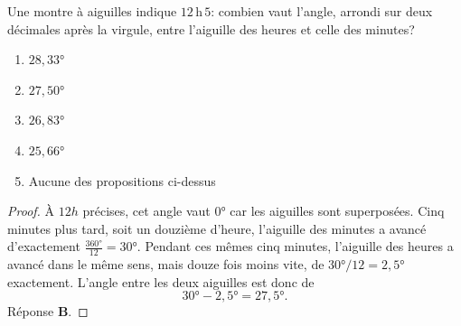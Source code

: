 % 
%
Une montre à aiguilles indique $12$\,h\,$5$: combien vaut l'angle, arrondi sur deux décimales après la virgule, entre %
l'aiguille des heures et celle des minutes?
%
\begin{enumerate}
  \item $28,33°$
  \item $27,50°$
  \item $26,83°$
  \item $25,66°$
  \item Aucune des propositions ci-dessus
\end{enumerate}
% 
\begin{proof}
%
À $12h$ précises, cet angle vaut $0°$ car les aiguilles sont superposées. Cinq minutes plus tard, soit un douzième d'heure, %
l'aiguille des minutes a avancé d'exactement $\frac{360°}{12} = 30°$. Pendant ces mêmes cinq minutes, l'aiguille des heures a %
avancé dans le même sens, mais douze fois moins vite, de $30°/12 = 2,5°$ exactement. L'angle entre les deux aiguilles est %
donc de %
%
\begin{equation}
  30° - 2,5° = 27,5°.
\end{equation}
%
Réponse \textbf{B}.
\end{proof}